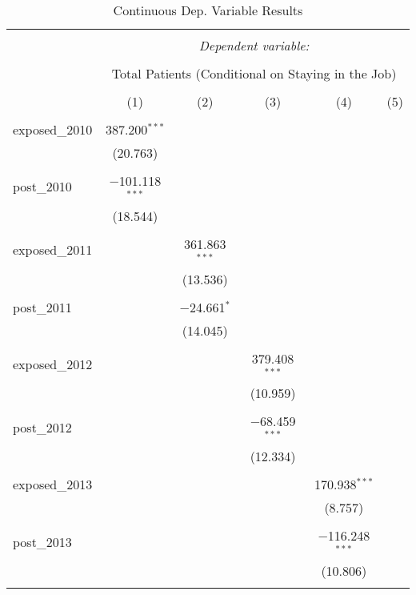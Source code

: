 
\begin{table}[!htbp] \centering 
  \caption{Continuous Dep. Variable Results} 
  \label{} 
\begin{tabular}{@{\extracolsep{5pt}}lccccc} 
\\[-1.8ex]\hline 
\hline \\[-1.8ex] 
 & \multicolumn{5}{c}{\textit{Dependent variable:}} \\ 
\cline{2-6} 
\\[-1.8ex] & \multicolumn{5}{c}{Total Patients (Conditional on Staying in the Job)} \\ 
\\[-1.8ex] & (1) & (2) & (3) & (4) & (5)\\ 
\hline \\[-1.8ex] 
 exposed\_2010 & 387.200$^{***}$ &  &  &  &  \\ 
  & (20.763) &  &  &  &  \\ 
  & & & & & \\ 
 post\_2010 & $-$101.118$^{***}$ &  &  &  &  \\ 
  & (18.544) &  &  &  &  \\ 
  & & & & & \\ 
 exposed\_2011 &  & 361.863$^{***}$ &  &  &  \\ 
  &  & (13.536) &  &  &  \\ 
  & & & & & \\ 
 post\_2011 &  & $-$24.661$^{*}$ &  &  &  \\ 
  &  & (14.045) &  &  &  \\ 
  & & & & & \\ 
 exposed\_2012 &  &  & 379.408$^{***}$ &  &  \\ 
  &  &  & (10.959) &  &  \\ 
  & & & & & \\ 
 post\_2012 &  &  & $-$68.459$^{***}$ &  &  \\ 
  &  &  & (12.334) &  &  \\ 
  & & & & & \\ 
 exposed\_2013 &  &  &  & 170.938$^{***}$ &  \\ 
  &  &  &  & (8.757) &  \\ 
  & & & & & \\ 
 post\_2013 &  &  &  & $-$116.248$^{***}$ &  \\ 
  &  &  &  & (10.806) &  \\ 
  & & & & & \\ 

\end{tabular}
\end{table}
